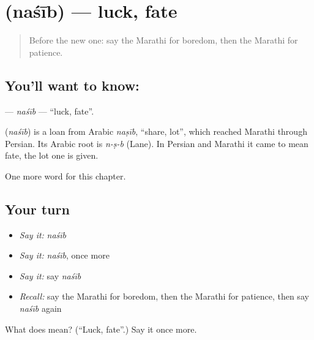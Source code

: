 \section[\texorpdfstring{\mr{नशीब} (naśīb)}{नशीब (naśīb)}]{ (naśīb) — luck, fate}

\label{lesson:MR-C170-nasib}



\begin{quote}
Before the new one: say the Marathi for boredom, then the Marathi for patience.
\end{quote}

\subsection*{You'll want to know: }
\textbf{} — \emph{naśīb} — \textquotedblleft{}luck, fate\textquotedblright{}.

\begin{cousinweb}
\textbf{} (\emph{naśīb}) is a loan from Arabic \emph{naṣīb}, \textquotedblleft{}share, lot\textquotedblright{}, which reached Marathi through Persian. Its Arabic root is \emph{n-ṣ-b} (Lane). In Persian and Marathi it came to mean fate, the lot one is given.
\end{cousinweb}

\begin{grammarlens}[title={What you've built}]
One more word for this chapter.
\end{grammarlens}

\subsection*{Your turn}
\begin{itemize}
\raggedright
  \item \emph{Say it:} \emph{naśīb}
  \item \emph{Say it:} \emph{naśīb}, once more
  \item \emph{Say it:} say \emph{naśīb}
  \item \emph{Recall:} say the Marathi for boredom, then the Marathi for patience, then say \emph{naśīb} again
\end{itemize}

\begin{tcolorbox}[breakable,colback=teal!4,colframe=teal!35!black,title={Before you move on}]
What does  mean? (\textquotedblleft{}Luck, fate\textquotedblright{}.) Say it once more.
\end{tcolorbox}
